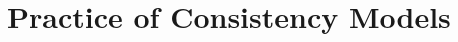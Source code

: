 \documentclass{beamer}
\makeatletter
\newcommand{\citeinbeamer}[3]{{\scriptsize{\textcolor{blue}{[#1@#2'#3]}}}}
\newcommand{\fig}[3]
{
  \begin{figure}[htp]
    \centering
      \texttt{[image: \#2]}
      \caption[labelInTOC]{#3}
  \end{figure}
}
\newcommand{\red}[1]{\textcolor{red}{#1}}
\makeatother
\begin{document}

\section{Practice of Consistency Models}
\end{document}
